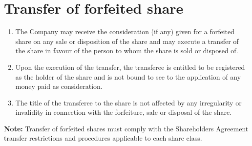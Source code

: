 \section{Transfer of forfeited share}

\begin{enumerate}[label=(\alph*)]
    \item The Company may receive the consideration (if any) given for a forfeited share on any sale or disposition of the share and may execute a transfer of the share in favour of the person to whom the share is sold or disposed of.
    
    \item Upon the execution of the transfer, the transferee is entitled to be registered as the holder of the share and is not bound to see to the application of any money paid as consideration.
    
    \item The title of the transferee to the share is not affected by any irregularity or invalidity in connection with the forfeiture, sale or disposal of the share.
\end{enumerate}

\textbf{Note:} Transfer of forfeited shares must comply with the Shareholders Agreement transfer restrictions and procedures applicable to each share class. 